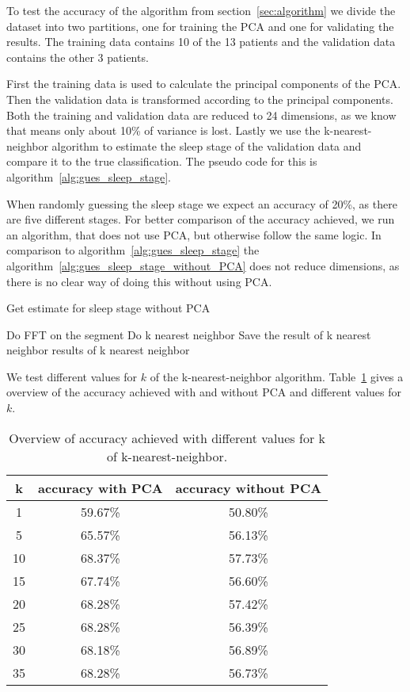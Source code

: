 To test the accuracy of the algorithm from section~\ref{sec:algorithm} we divide the dataset into two partitions, one for training the PCA and one for validating the results. The training data contains 10 of the 13 patients and the validation data contains the other 3 patients.

First the training data is used to calculate the principal components of the PCA. Then the validation data is transformed according to the principal components. Both the training and validation data are reduced to 24 dimensions, as we know that means only about 10\% of variance is lost. Lastly we use the k-nearest-neighbor algorithm to estimate the sleep stage of the validation data and compare it to the true classification. The pseudo code for this is algorithm~\ref{alg:gues_sleep_stage}.

When randomly guessing the sleep stage we expect an accuracy of 20\%, as there are five different stages. For better comparison of the accuracy achieved, we run an algorithm, that does not use PCA, but otherwise follow the same logic. In comparison to algorithm~\ref{alg:gues_sleep_stage} the algorithm~\ref{alg:gues_sleep_stage_without_PCA} does not reduce dimensions, as there is no clear way of doing this without using PCA.

\begin{algorithm}
	\caption{Get estimate for sleep stage without PCA}\label{alg:gues_sleep_stage_without_PCA}
	\begin{algorithmic}
		\State Do FFT on the segment
		\State Do k nearest neighbor
		\State Save the result of k nearest neighbor
		\EndFor
		\State \Return results of k nearest neighbor
	\end{algorithmic}
\end{algorithm}

We test different values for $k$ of the k-nearest-neighbor algorithm. Table~\ref{tab:error_validation_overview} gives a overview of the accuracy achieved with and without PCA and different values for $k$.

\begin{table}
	\centering
	\begin{tabular}{c|c|c}
		k & accuracy with PCA & accuracy without PCA \\
		\hline
		1  & 59.67\% & 50.80\% \\
		5  & 65.57\% & 56.13\% \\
		10 & 68.37\% & 57.73\% \\
		15 & 67.74\% & 56.60\% \\
		20 & 68.28\% & 57.42\% \\
		25 & 68.28\% & 56.39\% \\
		30 & 68.18\% & 56.89\% \\
		35 & 68.28\% & 56.73\% \\
	\end{tabular}
	\caption{Overview of accuracy achieved with different values for k of k-nearest-neighbor.}
	\label{tab:error_validation_overview}
\end{table}

